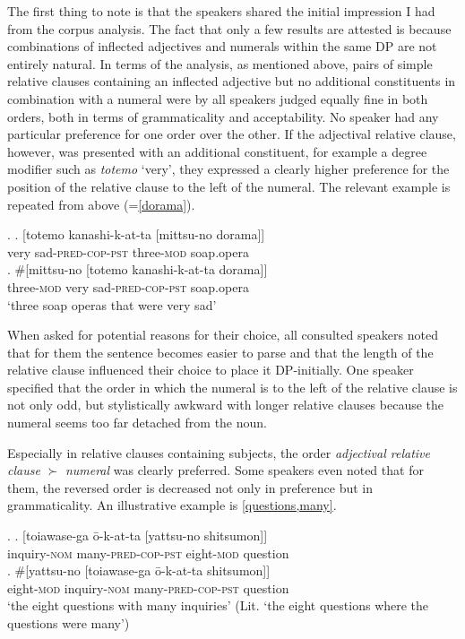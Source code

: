 The first thing to note is that the speakers shared the initial impression I had from the corpus analysis. The fact that only a few results are attested is because combinations of inflected adjectives and numerals within the same DP are not entirely natural. In terms of the analysis, as mentioned above, pairs of simple relative clauses containing an inflected adjective but no additional constituents in combination with a numeral were by all speakers judged equally fine in both orders, both in terms of grammaticality and acceptability. No speaker had any particular preference for one order over the other. If the adjectival relative clause, however, was presented with an additional constituent, for example a degree modifier such as \textit{totemo} `very’, they expressed a clearly higher preference for the position of the relative clause to the left of the numeral. The relevant example is repeated from above (=\ref{dorama}).

\ex. \ag. [totemo kanashi-k-at-ta [mittsu-no dorama]]\\
very sad-\textsc{pred-cop-pst} three-\textsc{mod} soap.opera\\
\bg. \#[mittsu-no [totemo kanashi-k-at-ta dorama]]\\
three-\textsc{mod} very sad-\textsc{pred-cop-pst} soap.opera\\
`three soap operas that were very sad'

When asked for potential reasons for their choice, all consulted speakers noted that for them the sentence becomes easier to parse and that the length of the relative clause influenced their choice to place it DP-initially. One speaker specified that the order in which the numeral is to the left of the relative clause is not only odd, but stylistically awkward with longer relative clauses because the numeral seems too far detached from the noun.

Especially in relative clauses containing subjects, the order \textit{adjectival relative clause} $\succ$ \textit{numeral} was clearly preferred. Some speakers even noted that for them, the reversed order is decreased not only in preference but in grammaticality. An illustrative example is \ref{questions,many}.

\ex. \label{questions,many} \ag. [toiawase-ga ō-k-at-ta [yattsu-no shitsumon]]\\
inquiry-\textsc{nom} many-\textsc{pred-cop-pst} eight-\textsc{mod} question\\
\bg. \#[yattsu-no [toiawase-ga ō-k-at-ta shitsumon]]\\
eight-\textsc{mod} inquiry-\textsc{nom} many-\textsc{pred-cop-pst} question\\
`the eight questions with many inquiries’ (Lit. `the eight questions where the questions were many’)

